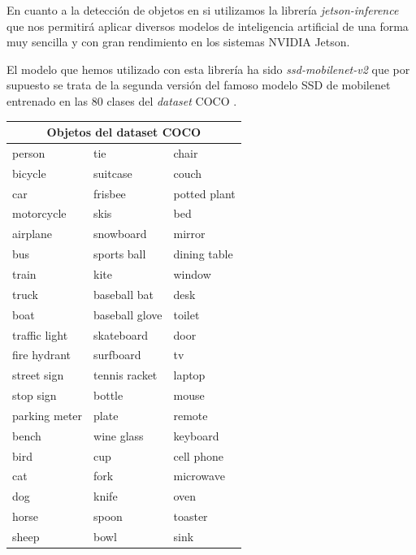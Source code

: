 En cuanto a la detección de objetos en si utilizamos la librería \textit{jetson-inference} que nos permitirá aplicar diversos modelos de inteligencia artificial de una forma muy sencilla y con gran rendimiento en los sistemas NVIDIA Jetson.

El modelo que hemos utilizado con esta librería ha sido \textit{ssd-mobilenet-v2} que por supuesto se trata de la segunda versión del famoso modelo SSD de mobilenet entrenado en las 80 clases del \textit{dataset} COCO \cite{lin2014microsoft}.

\begin{table}[h!]
    \centering
    \begin{tabular}{@{}lll@{}}
    \toprule
    \multicolumn{3}{c}{Objetos del dataset COCO}  \\ \midrule
    person        & tie            & chair        \\
    bicycle       & suitcase       & couch        \\
    car           & frisbee        & potted plant \\
    motorcycle    & skis           & bed          \\
    airplane      & snowboard      & mirror       \\
    bus           & sports ball    & dining table \\
    train         & kite           & window       \\
    truck         & baseball bat   & desk         \\
    boat          & baseball glove & toilet       \\
    traffic light & skateboard     & door         \\
    fire hydrant  & surfboard      & tv           \\
    street sign   & tennis racket  & laptop       \\
    stop sign     & bottle         & mouse        \\
    parking meter & plate          & remote       \\
    bench         & wine glass     & keyboard     \\
    bird          & cup            & cell phone   \\
    cat           & fork           & microwave    \\
    dog           & knife          & oven         \\
    horse         & spoon          & toaster      \\
    sheep         & bowl           & sink         \\

\end{tabular}
\end{table}
